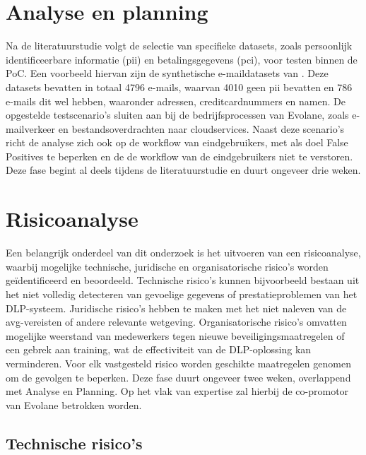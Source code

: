 \section{Analyse en planning}%

Na de literatuurstudie volgt de selectie van specifieke datasets, zoals persoonlijk identificeerbare informatie (\gls{pii}) en betalingsgegevens (\gls{pci}), voor testen binnen de PoC.
Een voorbeeld hiervan zijn de synthetische e-maildatasets van \textcite{Whelan2014}. 
Deze datasets bevatten in totaal 4796 e-mails, waarvan 4010 geen \gls{pii} bevatten en 786 e-mails dit wel hebben, 
waaronder adressen, creditcardnummers en namen. 
De opgestelde testscenario's sluiten aan bij de bedrijfsprocessen van Evolane, zoals e-mailverkeer en bestandsoverdrachten naar cloudservices. 
Naast deze scenario's richt de analyse zich ook op de workflow van eindgebruikers, met als doel False Positives te beperken en de de workflow van de eindgebruikers niet te verstoren.
Deze fase begint al deels tijdens de literatuurstudie en duurt ongeveer drie weken.

\section{Risicoanalyse}%

Een belangrijk onderdeel van dit onderzoek is het uitvoeren van een risicoanalyse, waarbij mogelijke technische, juridische en organisatorische risico's worden geïdentificeerd en beoordeeld. 
Technische risico's kunnen bijvoorbeeld bestaan uit het niet volledig detecteren van gevoelige gegevens of prestatieproblemen van het DLP-systeem. 
Juridische risico's hebben te maken met het niet naleven van de \gls{avg}-vereisten of andere relevante wetgeving. 
Organisatorische risico's omvatten mogelijke weerstand van medewerkers tegen nie\-uwe beveiligingsmaatregelen of een gebrek aan training, 
wat de effectiviteit van de DLP-oplossing kan verminderen. 
Voor elk vastgesteld risico worden geschikte maatregelen genomen om de gevolgen te beperken. 
Deze fase duurt ongeveer twee weken, overlappend met Analyse en Planning. Op het vlak van expertise zal hierbij de co-promotor van Evolane betrokken worden. 

\subsection{Technische risico's}

